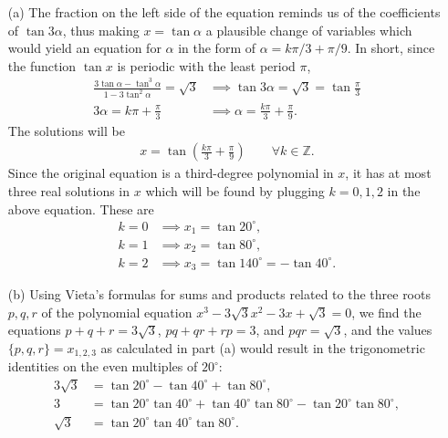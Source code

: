 \documentclass[12pt,a4paper]{memoir}
\theoremstyle{definition}
\begin{document}
\begin{solution}[name=Solution by Parviz Shahriari]
	\begin{itemize}
		\item[(a)] The fraction on the left side of the equation reminds us of the coefficients of $\tan 3\alpha$, thus making $x=\tan \alpha$ a plausible change of variables which would yield an equation for $\alpha$ in the form of $\alpha = k\pi/3 + \pi/9$. In short, since the function $\tan x$ is periodic with the least period $\pi$,
		\begin{align*}
			\frac{3\tan \alpha - \tan^3 \alpha}{1 - 3 \tan^2 \alpha} = \sqrt 3 &\implies \tan 3 \alpha = \sqrt 3 = \tan \frac{\pi}{3}\\ 3\alpha = k\pi + \frac{\pi}{3} &\implies \alpha = \frac{k\pi}{3}+\frac{\pi}{9}.
		\end{align*}
		The solutions will be
		\begin{align*}
			x=\tan\left(\frac{k\pi}{3}+\frac{\pi}{9}\right) \qquad \forall k \in \mathbb Z.
		\end{align*}
		Since the original equation is a third-degree polynomial in $x$, it has at most three real solutions in $x$ which will be found by plugging $k=0,1,2$ in the above equation. These are
		\begin{align*}
			k=0 & \implies x_1 = \tan 20^\circ,\\
			k=1 & \implies x_2 = \tan 80^\circ,\\
			k=2 &\implies x_3 = \tan 140^\circ = -\tan 40^\circ.
		\end{align*}
		\item[(b)] Using Vieta's formulas for sums and products related to the three roots $p,q,r$ of the polynomial equation $x^3 - 3\sqrt 3 x^2 - 3x + \sqrt 3 = 0$, we find the equations $p+q+r=3\sqrt 3$, $pq+qr+rp=3$, and $pqr=\sqrt 3$, and the values $\{p,q,r\}=x_{1,2,3}$ as calculated in part (a) would result in the trigonometric identities on the even multiples of $20^\circ$:
		\begin{align*}
			3 \sqrt 3 &= \tan 20^\circ - \tan 40^\circ + \tan 80^\circ,\\
			3 &= \tan 20^\circ \tan 40^\circ + \tan 40^\circ \tan 80^\circ - \tan 20^\circ\tan 80^\circ,\\
			\sqrt 3 &= \tan 20^\circ \tan 40^\circ \tan 80^\circ.
		\end{align*}
	\end{itemize}
\end{solution}
\end{document}
